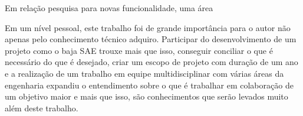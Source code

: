 Em relação pesquisa para novas funcionalidade, uma área 

Em um nível pessoal, este trabalho foi de grande importância para o autor não apenas pelo conhecimento técnico adquiro. Participar do desenvolvimento de um projeto como o baja SAE trouxe mais que isso, conseguir conciliar o que é necessário do que é desejado, criar um escopo de projeto com duração de um ano e a realização de um trabalho em equipe multidisciplinar com várias áreas da engenharia expandiu o entendimento sobre o que é trabalhar em colaboração de um objetivo maior e mais que isso, são conhecimentos que serão levados muito além deste trabalho.   